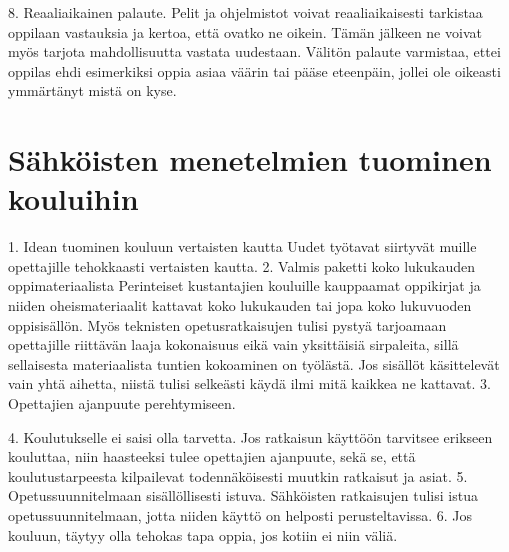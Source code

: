 \documentclass[utf8,bachelor]{gradu3}
\begin{document}
8. Reaaliaikainen palaute.
Pelit ja ohjelmistot voivat reaaliaikaisesti tarkistaa oppilaan vastauksia ja kertoa, että ovatko ne oikein. Tämän jälkeen ne voivat myös tarjota mahdollisuutta vastata uudestaan. Välitön palaute varmistaa, ettei oppilas ehdi esimerkiksi oppia asiaa väärin tai pääse eteenpäin, jollei ole oikeasti ymmärtänyt mistä on kyse.

\section{Sähköisten menetelmien tuominen kouluihin}
1. Idean tuominen kouluun vertaisten kautta
Uudet työtavat siirtyvät muille opettajille tehokkaasti vertaisten kautta. \parencite[][]{koulunArki}
2. Valmis paketti koko lukukauden oppimateriaalista
Perinteiset kustantajien kouluille kauppaamat oppikirjat ja niiden oheismateriaalit kattavat koko lukukauden tai jopa koko lukuvuoden oppisisällön. Myös teknisten opetusratkaisujen tulisi pystyä tarjoamaan opettajille riittävän laaja kokonaisuus eikä vain yksittäisiä sirpaleita, sillä sellaisesta materiaalista tuntien kokoaminen on työlästä. Jos sisällöt käsittelevät vain yhtä aihetta, niistä tulisi selkeästi käydä ilmi mitä kaikkea ne kattavat.
3. Opettajien ajanpuute perehtymiseen.

4. Koulutukselle ei saisi olla tarvetta.
Jos ratkaisun käyttöön tarvitsee erikseen kouluttaa, niin haasteeksi tulee opettajien ajanpuute, sekä se, että koulutustarpeesta kilpailevat todennäköisesti muutkin ratkaisut ja asiat.
5. Opetussuunnitelmaan sisällöllisesti istuva.
Sähköisten ratkaisujen tulisi istua opetussuunnitelmaan, jotta niiden käyttö on helposti perusteltavissa.
6. Jos kouluun, täytyy olla tehokas tapa oppia, jos kotiin ei niin väliä.
\end{document}

